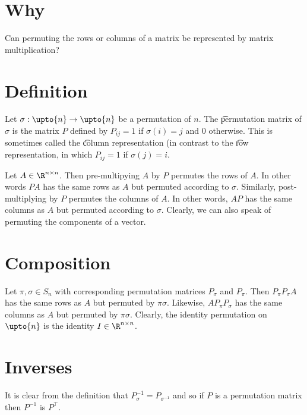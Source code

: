 
\section*{Why}

Can permuting the rows or columns of a matrix be represented by matrix multiplication?

\section*{Definition}

Let $\sigma  : \upto{n} \to \upto{n}$ be a permutation of $n$.
The \t{permutation matrix} of $\sigma  $ is the matrix $P$ defined by $P_{ij} = 1$ if $\sigma (i) = j$ and 0 otherwise.
This is sometimes called the \t{column representation} (in contrast to the \t{row representation}, in which $P_{ij} = 1$ if $\sigma (j) = i$.

Let $A \in \R ^{n \times  n}$.
Then pre-multipying $A$ by $P$ permutes the rows of $A$.
In other words $PA$ has the same rows as $A$ but permuted according to $\sigma $.
Similarly, post-multiplying by $P$ permutes the columns of $A$.
In other words, $AP$ has the same columns as $A$ but permuted according to $\sigma  $.
Clearly, we can also speak of permuting the components of a vector.

\section*{Composition}

Let $\pi  , \sigma  \in S_n$ with corresponding permutation matrices $P_\sigma  $ and $P_\pi  $.
Then $P_{\pi  }P_{\sigma  }A$ has the same rows as $A$ but permuted by $\pi  \sigma  $.
Likewise, $AP_{\pi  }P_{\sigma  }$ has the same columns as $A$ but permuted by $\pi  \sigma  $.
Clearly, the identity permutation on $\upto{n}$ is the identity $I \in \R  ^{n \times  n}$.

\section*{Inverses}

It is clear from the definition that $P_{\sigma  }^{-1} = P_{\sigma  ^{-1}}$ and so if $P$ is a permutation matrix then $P^{-1}$ is $P^\top $.

\blankpage